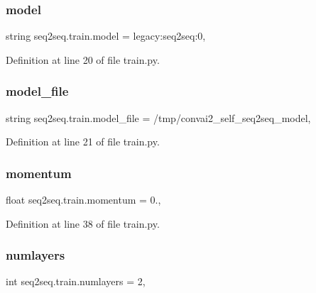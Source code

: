 \subsubsection{\texorpdfstring{model}{model}}
{\footnotesize\ttfamily string seq2seq.\+train.\+model = \textquotesingle{}legacy\+:seq2seq\+:0\textquotesingle{},}



Definition at line 20 of file train.\+py.

\mbox{\label{namespaceseq2seq_1_1train_a5d74abab93fc557cc5139de539cb1970}} 
\subsubsection{\texorpdfstring{model\+\_\+file}{model\_file}}
{\footnotesize\ttfamily string seq2seq.\+train.\+model\+\_\+file = \textquotesingle{}/tmp/convai2\+\_\+self\+\_\+seq2seq\+\_\+model\textquotesingle{},}



Definition at line 21 of file train.\+py.

\mbox{\label{namespaceseq2seq_1_1train_a3faade37a4499019f011811d0879b3e2}} 
\subsubsection{\texorpdfstring{momentum}{momentum}}
{\footnotesize\ttfamily float seq2seq.\+train.\+momentum = 0.,}



Definition at line 38 of file train.\+py.

\mbox{\label{namespaceseq2seq_1_1train_ad2a8f3a66d54e1de44ba1e4b0de47649}} 
\subsubsection{\texorpdfstring{numlayers}{numlayers}}
{\footnotesize\ttfamily int seq2seq.\+train.\+numlayers = 2,}




